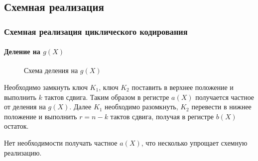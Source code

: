 \subsection{Схемная реализация}


\begin{frame}
    \frametitle{Схемная реализация циклического кодирования}
    \framesubtitle{Деление на $g(X)$}
    
    \begin{figure}
        \begin{center}
            \caption{Схема деления на $g(X)$}\label{pict:lfsrDiv}
        \end{center}
    \end{figure} 
\end{frame}

Необходимо замкнуть ключ $K_1$, ключ $K_2$ поставить в верхнее положение и выполнить $k$ тактов сдвига. Таким образом в регистре $a(X)$ получается частное от деления на $g(X)$. Далее $K_1$ необходимо разомкнуть, $K_2$ перевести в нижнее положение и выполнить $r=n-k$ тактов сдвига, получая в регистре $b(X)$ остаток.

Нет необходимости получать частное $a(X)$, что несколько упрощает схемную реализацию.

